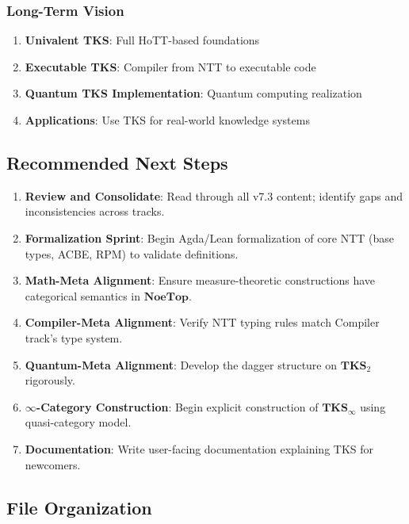 \subsubsection{Long-Term Vision}
\begin{enumerate}
  \item \textbf{Univalent TKS}: Full HoTT-based foundations
  \item \textbf{Executable TKS}: Compiler from NTT to executable code
  \item \textbf{Quantum TKS Implementation}: Quantum computing realization
  \item \textbf{Applications}: Use TKS for real-world knowledge systems
\end{enumerate}

\subsection{Recommended Next Steps}
\label{subsec:next-steps}

\begin{enumerate}
  \item \textbf{Review and Consolidate}: Read through all v7.3 content; identify
        gaps and inconsistencies across tracks.

  \item \textbf{Formalization Sprint}: Begin Agda/Lean formalization of
        core NTT (base types, ACBE, RPM) to validate definitions.

  \item \textbf{Math-Meta Alignment}: Ensure measure-theoretic constructions
        have categorical semantics in $\mathbf{NoeTop}$.

  \item \textbf{Compiler-Meta Alignment}: Verify NTT typing rules match
        Compiler track's type system.

  \item \textbf{Quantum-Meta Alignment}: Develop the dagger structure on
        $\mathbf{TKS}_2$ rigorously.

  \item \textbf{$\infty$-Category Construction}: Begin explicit construction
        of $\mathbf{TKS}_\infty$ using quasi-category model.

  \item \textbf{Documentation}: Write user-facing documentation explaining
        TKS for newcomers.
\end{enumerate}

\subsection{File Organization}
\label{subsec:file-org}


